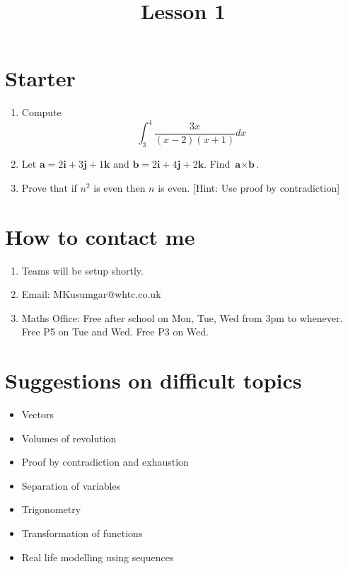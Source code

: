 \documentclass[12pt]{article}
\begin{document}
    \title{Lesson 1}

    \section*{Starter}
    \begin{enumerate}
        \item Compute \[ \int^4_{3} \frac{3x}{(x-2)(x+1)} dx\]
        \item Let $\textbf{a} = 2\textbf{i} + 3\textbf{j} + 1\textbf{k}$ 
        and $\textbf{b} = 2\textbf{i} + 4\textbf{j} + 2\textbf{k}$. Find $\textbf{a} \times \textbf{b}$.
        \item Prove that if $n^2$ is even then $n$ is even. [Hint: Use proof by contradiction]
    \end{enumerate}

    \section*{How to contact me}
    \begin{enumerate}
        \item Teams will be setup shortly.
        \item Email: MKusumgar@whtc.co.uk
        \item Maths Office: Free after school on Mon, Tue, Wed from 3pm to whenever. Free P5 on Tue and Wed. Free P3 on Wed.
    \end{enumerate}

    \section*{Suggestions on difficult topics}
    \begin{itemize}
        \item Vectors
        \item Volumes of revolution
        \item Proof by contradiction and exhaustion
        \item Separation of variables
        \item Trigonometry
        \item Transformation of functions
        \item Real life modelling using sequences
    \end{itemize}

\end{document}
